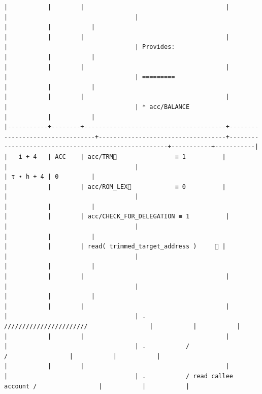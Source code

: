 \documentclass[varwidth=\maxdimen,margin=0.5cm,multi={verbatim}]{standalone}
\begin{document}
\begin{verbatim}
|           |        |                                       |                                 |                                   |                                                     |           |           |
|           |        |                                       |                                 |                                   | Provides:                                           |           |           |
|           |        |                                       |                                 |                                   | =========                                           |           |           |
|           |        |                                       |                                 |                                   | * acc/BALANCE                                       |           |           |
|-----------+--------+---------------------------------------+---------------------------------+-----------------------------------+-----------------------------------------------------+-----------+-----------|
|   i + 4   | ACC    | acc/TRM🚩                ≡ 1          |                                 |                                   |                                                     | τ ∙ h + 4 | 0         |
|           |        | acc/ROM_LEX🚩            ≡ 0          |                                 |                                   |                                                     |           |           |
|           |        | acc/CHECK_FOR_DELEGATION ≡ 1          |                                 |                                   |                                                     |           |           |
|           |        | read( trimmed_target_address )     👋 |                                 |                                   |                                                     |           |           |
|           |        |                                       |                                 |                                   |                                                     |           |           |
|           |        |                                       |                                 |                                   | .           ///////////////////////                 |           |           |
|           |        |                                       |                                 |                                   | .           /                     /                 |           |           |
|           |        |                                       |                                 |                                   | .           / read callee account /                 |           |           |

\end{verbatim}
\end{document}
